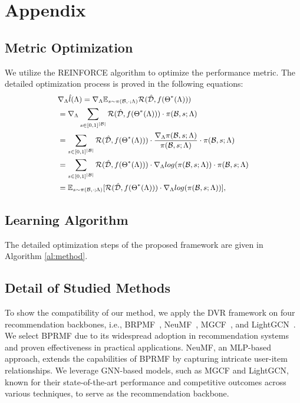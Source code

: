 \newpage
\appendix
\section{Appendix}
\subsection{Metric Optimization}  \label{app:pg}
We utilize the REINFORCE algorithm to optimize the performance metric. The detailed optimization process is proved in the following equations:
    \begin{equation}
        \small
        \begin{aligned}
            &\nabla_{\Lambda}\hat{l}(\Lambda)
            =\nabla_{\Lambda} \mathbb{E}_{s\sim \pi{(\mathcal{B},\cdot;{\Lambda})}} \mathcal{R}(\hat{\mathcal{D}}, f(\Theta^*(\Lambda)))\\
            &=\nabla_{\Lambda}\sum_{s\in[0,1]^{|\mathcal{B}|}} \mathcal{R}(\hat{\mathcal{D}}, f(\Theta^*(\Lambda))) \cdot \pi(\mathcal{B},s;{\Lambda}) \\
            &=\sum_{s\in[0,1]^{|\mathcal{B}|}} \mathcal{R}(\hat{\mathcal{D}}, f(\Theta^*(\Lambda))) \cdot 
            \frac{\nabla_{\Lambda}\pi(\mathcal{B},s;{\Lambda})}{\pi(\mathcal{B},s;{\Lambda})}\cdot \pi(\mathcal{B},s;{\Lambda})\\
            &= \sum_{s\in[0,1]^{|\mathcal{B}|}} \mathcal{R}(\hat{\mathcal{D}}, f(\Theta^*(\Lambda))) \cdot \nabla_{\Lambda}log(\pi(\mathcal{B},s;{\Lambda}))\cdot \pi(\mathcal{B},s;{\Lambda})\\
            &=\mathbb{E}_{s\sim \pi(\mathcal{B},\cdot;{\Lambda})}[\mathcal{R}(\hat{\mathcal{D}}, f(\Theta^*(\Lambda)))\cdot \nabla_{\Lambda}log(\pi(\mathcal{B},s;{\Lambda}))],
        \end{aligned}
    \end{equation}

\subsection{Learning Algorithm}  \label{app:learning_algorithm}
The detailed optimization steps of the proposed framework are given in Algorithm \ref{al:method}.

\subsection{Detail of Studied Methods} \label{app:studied method}
To show the compatibility of our method, we apply the DVR framework on four recommendation backbones, i.e., BRPMF~\cite{koren2009matrix}, NeuMF~\cite{he2017neural}, MGCF~\cite{wang2019neural}, and LightGCN~\cite{he2020lightgcn}. We select BPRMF due to its widespread adoption in recommendation systems and proven effectiveness in practical applications. NeuMF, an MLP-based approach, extends the capabilities of BPRMF by capturing intricate user-item relationships. We leverage GNN-based models, such as MGCF and LightGCN, known for their state-of-the-art performance and competitive outcomes across various techniques, to serve as the recommendation backbone. 

